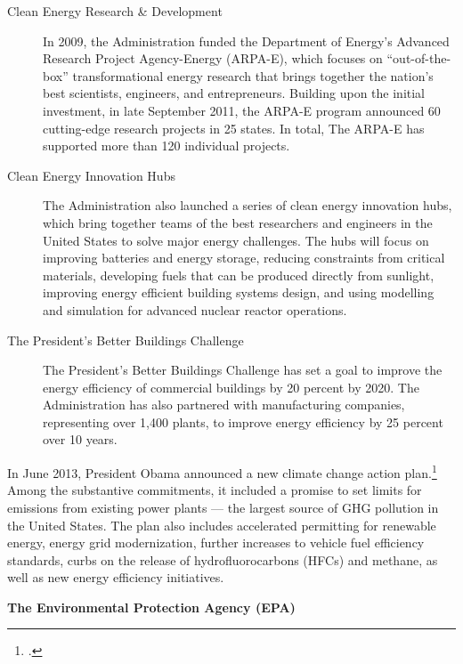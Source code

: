 \begin{description}
	\item [Clean Energy Research \& Development] In 2009, the Administration funded the Department of Energy’s Advanced Research Project Agency-Energy (ARPA-E), which focuses on “out-of-the-box” transformational energy research that brings together the nation’s best scientists, engineers, and entrepreneurs. Building upon the initial investment, in late September 2011, the ARPA-E program announced 60 cutting-edge research projects in 25 states. In total, The ARPA-E has supported more than 120 individual projects.
	\item [Clean Energy Innovation Hubs] The Administration also launched a series of clean energy innovation hubs, which bring together teams of the best researchers and engineers in the United States to solve major energy challenges. The hubs will focus on improving batteries and energy storage, reducing constraints from critical materials, developing fuels that can be produced directly from sunlight, improving energy efficient building systems design, and using modelling and simulation for advanced nuclear reactor operations.
	\item [The President's Better Buildings Challenge] The President's Better Buildings Challenge has set a goal to improve the energy efficiency of commercial buildings by 20 percent by 2020. The Administration has also partnered with manufacturing companies, representing over 1,400 plants, to improve energy efficiency by 25 percent over 10 years.
\end{description}	



In June 2013, President Obama announced a new climate change action plan.\footcite[][]{ObamaJune2013}
Among the substantive commitments, it included a promise to set limits for  emissions from existing power plants --- the largest source of GHG pollution in the United States.
The plan also includes accelerated permitting for renewable energy, energy grid modernization, further increases to vehicle fuel efficiency standards, curbs on the release of hydrofluorocarbons (HFCs) and methane, as well as new energy efficiency initiatives.



\textbf{The Environmental Protection Agency (EPA)}



